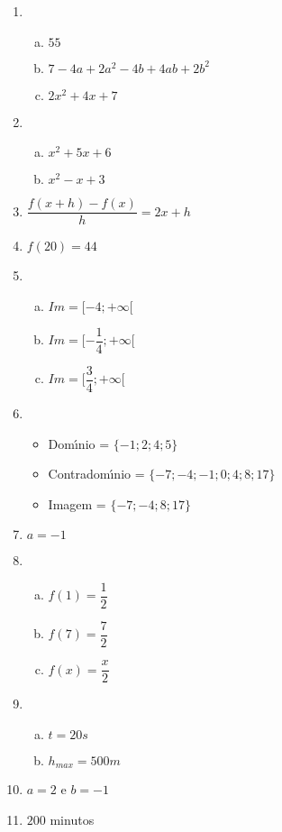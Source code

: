 \begin{res}
\begin{multicols}{2}

\begin{enumerate}[(1)]

\item\begin{enumerate}[(a)]
\item $55$
\item $7 - 4 a + 2 a^{2} - 4 b + 4 a b + 2 b^{2}$
\item $2x^{2}+4x+7$
\end{enumerate}

\item\begin{enumerate}[(a)]
\item $x^{2}+5x+6$
\item $x^{2}-x+3$
\end{enumerate}

\item $\dfrac{f\left( x+h\right) -f\left( x\right) }{h}=2x+h$

\item $f\left( 20\right)=44$

\item\begin{enumerate}[(a)]
\item $Im=[-4;+\infty[$
\item $Im=[-\dfrac{1}{4};+\infty[$
\item $Im=[\dfrac{3}{4};+\infty[$
\end{enumerate}
\columnbreak
\item \begin{itemize}
  \item Dom\'{\i}nio = $\{ -1;2;4;5\}$
  \item Contradom\'{\i}nio = $\{-7;-4;-1;0;4;8;17\}$
  \item Imagem = $\{-7;-4;8;17\}$
\end{itemize}

\item $a=-1$

\item\begin{enumerate}[(a)]
\item $f\left( 1\right)=\dfrac{1}{2}$
\item  $f\left( 7\right)=\dfrac{7}{2}$
\item  $f\left( x\right)=\dfrac{x}{2}$
\end{enumerate}

\item\begin{enumerate}[(a)]
\item $t=20s$
\item  $h_{max}=500m$
\end{enumerate}

\item $a=2$ e $b=-1$

\item $200$ minutos

\end{enumerate}
\end{multicols}
\end{res}

